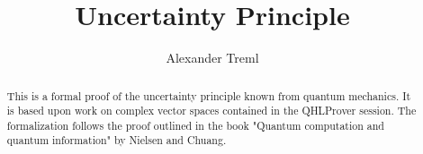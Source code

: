 \documentclass[11pt,a4paper]{article}
\begin{document}
\title{Uncertainty Principle}
\author{Alexander Treml}
\maketitle

\begin{abstract}
	This is a formal proof of the uncertainty principle known from quantum  mechanics. 
	It is based upon work on complex vector spaces contained in the QHLProver session\cite{QHLProver-AFP}.
	The formalization follows the proof outlined in the book "Quantum computation and quantum information" by Nielsen and Chuang\cite{nielsen2010quantum}.
\end{abstract}

\tableofcontents

\pagebreak





\end{document}
